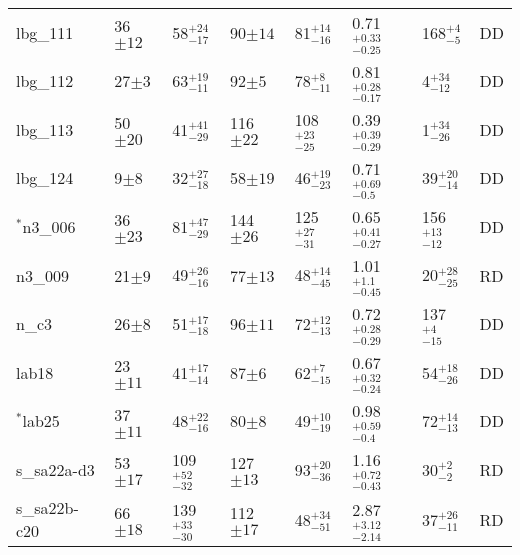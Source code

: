 \documentclass[fleqn,usenatbib]{mn2e}
\begin{document}
\begin{table*}
\begin{threeparttable}
\begin{tabular}{llllllll}
lbg\_111        & 36$\pm12$         & 58$^{+24}_{-17}$                     & 90$\pm14$                  & 81$^{+14}_{-16}$                   & 0.71$^{+0.33}_{-0.25}$                 & 168$^{+4}_{-5}$ & DD  \\[1ex]
lbg\_112         & 27$\pm3$                    & 63$^{+19}_{-11}$                    & 92$\pm5$                 & 78$^{+8}_{-11}$       & 0.81$^{+0.28}_{-0.17}$               & 4$^{+34}_{-12}$ & DD \\[1ex]
lbg\_113        & 50$\pm20$           & 41$^{+41}_{-29}$                     & 116$\pm22$                 & 108$^{+23}_{-25}$                  & 0.39$^{+0.39}_{-0.29}$                & 1$^{+34}_{-26}$  & DD   \\[1ex]
lbg\_124         & 9$\pm8$                    & 32$^{+27}_{-18}$                    & 58$\pm19$                 & 46$^{+19}_{-23}$       & 0.71$^{+0.69}_{-0.5}$               & 39$^{+20}_{-14}$ & DD \\[1ex]
$^{*}$n3\_006         & 36$\pm23$                    & 81$^{+47}_{-29}$                     & 144$\pm26$                 & 125$^{+27}_{-31}$          & 0.65$^{+0.41}_{-0.27}$                & 156$^{+13}_{-12}$ & DD   \\[1ex]
n3\_009         & 21$\pm9$                    & 49$^{+26}_{-16}$                     & 77$\pm13$                  & 48$^{+14}_{-45}$          & 1.01$^{+1.1}_{-0.45}$                & 20$^{+28}_{-25}$  & RD   \\[1ex]
n\_c3           & 26$\pm8$                    & 51$^{+17}_{-18}$                     & 96$\pm11$                  & 72$^{+12}_{-13}$          & 0.72$^{+0.28}_{-0.29}$                & 137$^{+4}_{-15}$  & DD  \\[1ex]
lab18           & 23$\pm11$                   & 41$^{+17}_{-14}$                     & 87$\pm6$                  & 62$^{+7}_{-15}$           & 0.67$^{+0.32}_{-0.24}$                 & 54$^{+18}_{-26}$ & DD    \\[1ex]
$^{*}$lab25           & 37$\pm11$                    & 48$^{+22}_{-16}$                     & 80$\pm8$                  & 49$^{+10}_{-19}$          & 0.98$^{+0.59}_{-0.4}$                & 72$^{+14}_{-13}$ & DD   \\[1ex]
s\_sa22a-d3     & 53$\pm17$                    & 109$^{+52}_{-32}$                    & 127$\pm13$                 & 93$^{+20}_{-36}$          & 1.16$^{+0.72}_{-0.43}$               & 30$^{+2}_{-2}$ & RD    \\[1ex]
s\_sa22b-c20    & 66$\pm18$                    & 139$^{+33}_{-30}$                    & 112$\pm17$                 & 48$^{+34}_{-51}$          & 2.87$^{+3.12}_{-2.14}$                & 37$^{+26}_{-11}$ & RD   \\[1ex]

\end{tabular}
\end{threeparttable}
\end{table*}
\end{document}
